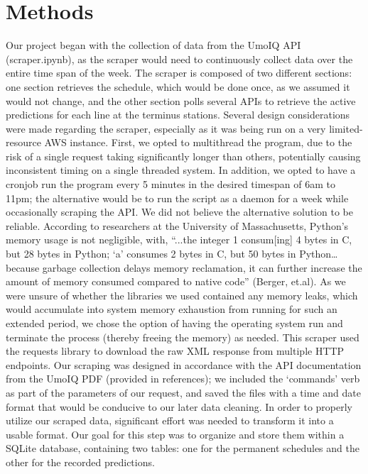 \documentclass[]{article}
\begin{document}
	\section{Methods}
	Our project began with the collection of data from the UmoIQ API (scraper.ipynb), as the scraper would need to continuously collect data over the entire time span of the week. The scraper is composed of two different sections: one section retrieves the schedule, which would be done once, as we assumed it would not change, and the other section polls several APIs to retrieve the active predictions for each line at the terminus stations. Several design considerations were made regarding the scraper, especially as it was being run on a very limited-resource AWS instance. First, we opted to multithread the program, due to the risk of a single request taking significantly longer than others, potentially causing inconsistent timing on a single threaded system. In addition, we opted to have a cronjob run the program every 5 minutes in the desired timespan of 6am to 11pm; the alternative would be to run the script as a daemon for a week while occasionally scraping the API. We did not believe the alternative solution to be reliable. According to researchers at the University of Massachusetts, Python’s memory usage is not negligible, with, “...the integer 1 consum[ing] 4 bytes in C, but 28 bytes in Python; ‘a’ consumes 2 bytes in C, but 50 bytes in Python…because garbage collection delays memory reclamation, it can further increase the amount of memory consumed compared to native code” (Berger, et.al). As we were unsure of whether the libraries we used contained any memory leaks, which would accumulate into system memory exhaustion from running for such an extended period, we chose the option of having the operating system run and terminate the process (thereby freeing the memory) as needed. This scraper used the requests library to download the raw XML response from multiple HTTP endpoints. Our scraping was designed in accordance with the API documentation from the UmoIQ PDF (provided in references); we included the ‘commands’ verb as part of the parameters of our request, and saved the files with a time and date format that would be conducive to our later data cleaning.
	In order to properly utilize our scraped data, significant effort was needed to transform it into a usable format. Our goal for this step was to organize and store them within a SQLite database, containing two tables: one for the permanent schedules and the other for the recorded predictions. 
	
\end{document}
